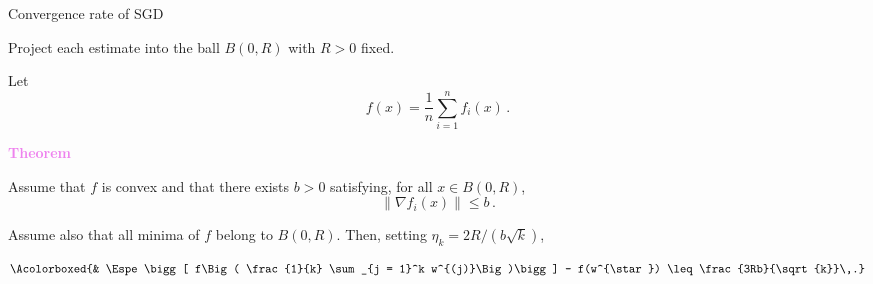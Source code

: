 \documentclass[xcolor={usenames,dvipsnames}]{beamer}
\begin{document}
\begin{frame}{Convergence rate of SGD}
	
\alert{Project each estimate into the ball $B(0,R)$} with $R>0$ fixed. 
	
\medskip 

Let 
$$
f (x) = \frac{1}{n} \sum_{i=1}^n f_i(x)\,.
$$
	
		
\medskip 
	
	
\textbf{\textcolor{violet}{Theorem}}

Assume that \alert{$f$ is convex} and that there exists $b>0$ satisfying, for all $x \in B(0,R)$, 
$$
\|\nabla f_i (x)\| \leqslant b\,.
$$		

\medskip  

Assume also that \alert{all minima of $f$ belong to $B(0,R)$}. Then, setting \alert{$\eta_k = 2R/(b\sqrt{k})$}, 
		
\begin{align*}
\Acolorboxed{&
\Espe \bigg[ f\Big( \frac{1}{k} \sum_{j = 1}^k w^{(j)}\Big)\bigg] - f(w^{\star}) \leq \frac{3Rb}{\sqrt{k}}\,.}
\end{align*}


\end{frame}


%	
%	
%
%	
%		
%	
%	
%
%
%
%		
%
%
\end{document}
